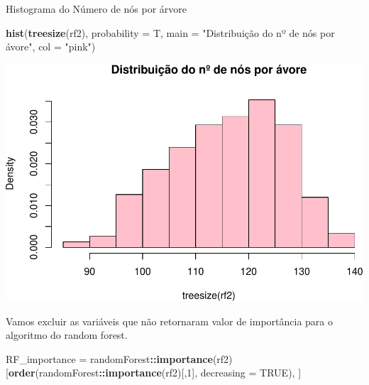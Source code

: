\documentclass[]{article}
\newenvironment{Shaded}{\begin{snugshade}}{\end{snugshade}}
\newcommand{\KeywordTok}[1]{\textcolor[rgb]{0.13,0.29,0.53}{\textbf{#1}}}
\newcommand{\DataTypeTok}[1]{\textcolor[rgb]{0.13,0.29,0.53}{#1}}
\newcommand{\DecValTok}[1]{\textcolor[rgb]{0.00,0.00,0.81}{#1}}
\newcommand{\StringTok}[1]{\textcolor[rgb]{0.31,0.60,0.02}{#1}}
\newcommand{\CommentTok}[1]{\textcolor[rgb]{0.56,0.35,0.01}{\textit{#1}}}
\newcommand{\OtherTok}[1]{\textcolor[rgb]{0.56,0.35,0.01}{#1}}
\newcommand{\OperatorTok}[1]{\textcolor[rgb]{0.81,0.36,0.00}{\textbf{#1}}}
\newcommand{\NormalTok}[1]{#1}
\begin{document}
Histograma do Número de nós por árvore

\begin{Shaded}
\begin{Highlighting}[]
\KeywordTok{hist}\NormalTok{(}\KeywordTok{treesize}\NormalTok{(rf2), }\DataTypeTok{probability =}\NormalTok{ T,}
     \DataTypeTok{main =} \StringTok{"Distribuição do nº de nós por ávore"}\NormalTok{,}
     \DataTypeTok{col =} \StringTok{"pink"}\NormalTok{)}
\end{Highlighting}
\end{Shaded}

\includegraphics{markdown_v41_test_files/figure-latex/unnamed-chunk-90-1.pdf}

Vamos excluir as variáveis que não retornaram valor de importância para
o algoritmo do random forest.

\begin{Shaded}
\begin{Highlighting}[]
\NormalTok{RF_importance =}\StringTok{ }\NormalTok{randomForest}\OperatorTok{::}\KeywordTok{importance}\NormalTok{(rf2)[}\KeywordTok{order}\NormalTok{(randomForest}\OperatorTok{::}\KeywordTok{importance}\NormalTok{(rf2)[,}\DecValTok{1}\NormalTok{], }\DataTypeTok{decreasing =} \OtherTok{TRUE}\NormalTok{), ]}
\end{Highlighting}
\end{Shaded}

\begin{Shaded}
\end{Shaded}
\end{document}
